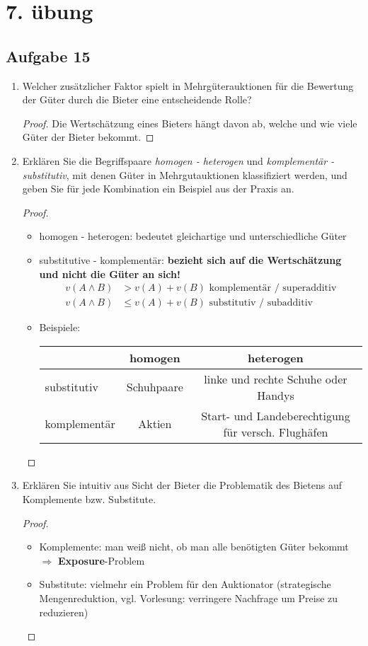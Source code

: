 \documentclass[12pt]{extreport} %
\theoremstyle{named}
\theoremstyle{nnamed}
\theoremstyle{itshape}
\theoremstyle{normal}
\begin{document}
\section*{7. übung}

\subsection*{Aufgabe 15}

\begin{enumerate}
	\item Welcher zusätzlicher Faktor spielt in Mehrgüterauktionen für die Bewertung der Güter durch die Bieter eine entscheidende Rolle?
		\begin{proof}
			Die Wertschätzung eines Bieters hängt davon ab, welche und wie viele Güter der Bieter bekommt.
		\end{proof}
	\item Erklären Sie die Begriffspaare \textit{homogen - heterogen} und \textit{komplementär - substitutiv}, mit denen Güter in Mehrgutauktionen klassifiziert werden, und geben Sie für jede Kombination ein Beispiel aus der Praxis an.
		\begin{proof} ~\
			\begin{itemize}
				\item homogen - heterogen: bedeutet gleichartige und unterschiedliche Güter
				\item substitutive - komplementär: \textbf{bezieht sich auf die Wertschätzung und nicht die Güter an sich!}
					\begin{align*}
						v(A \wedge B ) & > v(A) + v(B) \text{ komplementär / superadditiv} \\
						v(A \wedge B ) & \leq v(A) + v(B) \text{ substitutiv / subadditiv}
					\end{align*}
				\item Beispiele: ~\\
					\begin{tabular}{l|cc}
  						     & homogen    & heterogen \\
  								\hline
 				substitutiv  & Schuhpaare & linke und rechte Schuhe oder Handys \\
 				komplementär &   Aktien         & Start- und Landeberechtigung für versch. Flughäfen
			\end{tabular}

			\end{itemize}
		\end{proof}
	\item Erklären Sie intuitiv aus Sicht der Bieter die Problematik des Bietens auf Komplemente bzw. Substitute.
		\begin{proof} ~\
			\begin{itemize}
				\item Komplemente: man weiß nicht, ob man alle benötigten Güter bekommt $\Rightarrow$ \textbf{Exposure}-Problem
				\item Substitute: vielmehr ein Problem für den Auktionator (strategische Mengenreduktion, vgl. Vorlesung: verringere Nachfrage um Preise zu reduzieren)
			\end{itemize}
		\end{proof}
\end{enumerate}
\end{document}
